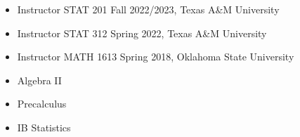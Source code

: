 

\begin{itemize}
	\item Instructor STAT 201 Fall 2022/2023, Texas A\&M University
	\item Instructor STAT 312 Spring 2022, Texas A\&M University
	\item Instructor MATH 1613 Spring 2018, Oklahoma State University
\end{itemize}

\divider
\medskip

\begin{itemize}
	\item Algebra II
	\item Precalculus
	\item IB Statistics
\end{itemize}








